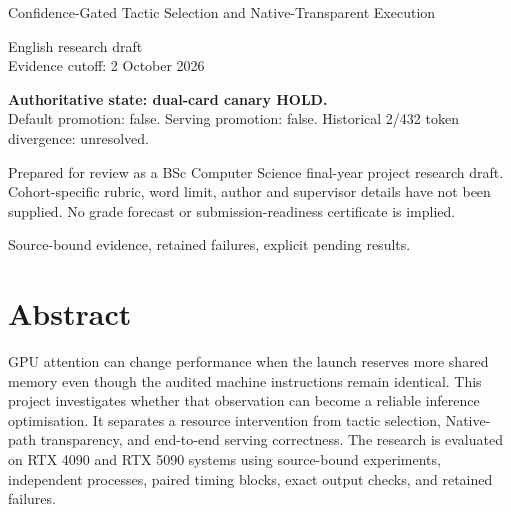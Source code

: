 \documentclass[11pt,a4paper]{article}
\begin{document}
\begin{titlepage}

\vspace*{2cm}{\Huge\bfseries Resource-Sensitive GPU Attention\par}\vspace{0.7cm}

{\Large Confidence-Gated Tactic Selection and Native-Transparent Execution\par}\vspace{1.4cm}

{\large English research draft\\Evidence cutoff: 2 October 2026\par}\vspace{1cm}

\textbf{Authoritative state: dual-card canary HOLD.}\\Default promotion: false. Serving promotion: false. Historical 2/432 token divergence: unresolved.\par\vspace{1cm}

Prepared for review as a BSc Computer Science final-year project research draft. Cohort-specific rubric, word limit, author and supervisor details have not been supplied. No grade forecast or submission-readiness certificate is implied.\par

\vfill Source-bound evidence, retained failures, explicit pending results.\end{titlepage}

\tableofcontents\clearpage

\clearpage

\section*{Abstract}


GPU attention can change performance when the launch reserves more shared memory even though the audited machine instructions remain identical. This project investigates whether that observation can become a reliable inference optimisation. It separates a resource intervention from tactic selection, Native-path transparency, and end-to-end serving correctness. The research is evaluated on RTX 4090 and RTX 5090 systems using source-bound experiments, independent processes, paired timing blocks, exact output checks, and retained failures.
\end{document}
